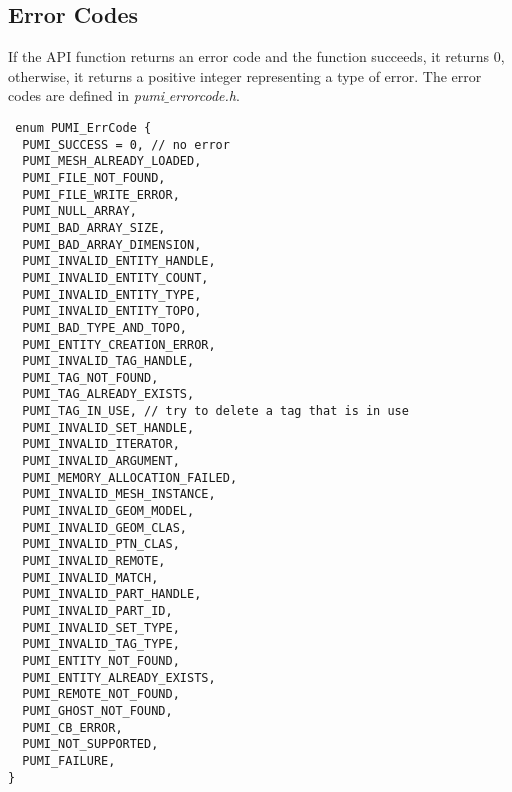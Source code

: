 \subsection{Error Codes}
If the API function returns an error code and the function succeeds, it returns 0,  otherwise, it returns a positive integer representing a type of error. The error codes are defined in \emph{pumi}$\_$\emph{errorcode.h}. 

\begin{verbatim}
 enum PUMI_ErrCode {
  PUMI_SUCCESS = 0, // no error
  PUMI_MESH_ALREADY_LOADED,
  PUMI_FILE_NOT_FOUND,
  PUMI_FILE_WRITE_ERROR,
  PUMI_NULL_ARRAY,
  PUMI_BAD_ARRAY_SIZE,
  PUMI_BAD_ARRAY_DIMENSION,
  PUMI_INVALID_ENTITY_HANDLE,
  PUMI_INVALID_ENTITY_COUNT,
  PUMI_INVALID_ENTITY_TYPE,
  PUMI_INVALID_ENTITY_TOPO,
  PUMI_BAD_TYPE_AND_TOPO,
  PUMI_ENTITY_CREATION_ERROR,
  PUMI_INVALID_TAG_HANDLE,
  PUMI_TAG_NOT_FOUND,
  PUMI_TAG_ALREADY_EXISTS,
  PUMI_TAG_IN_USE, // try to delete a tag that is in use
  PUMI_INVALID_SET_HANDLE,
  PUMI_INVALID_ITERATOR,
  PUMI_INVALID_ARGUMENT,
  PUMI_MEMORY_ALLOCATION_FAILED,
  PUMI_INVALID_MESH_INSTANCE,
  PUMI_INVALID_GEOM_MODEL,
  PUMI_INVALID_GEOM_CLAS,
  PUMI_INVALID_PTN_CLAS,
  PUMI_INVALID_REMOTE,
  PUMI_INVALID_MATCH,
  PUMI_INVALID_PART_HANDLE, 
  PUMI_INVALID_PART_ID,
  PUMI_INVALID_SET_TYPE,
  PUMI_INVALID_TAG_TYPE,
  PUMI_ENTITY_NOT_FOUND,
  PUMI_ENTITY_ALREADY_EXISTS,
  PUMI_REMOTE_NOT_FOUND,
  PUMI_GHOST_NOT_FOUND,
  PUMI_CB_ERROR,
  PUMI_NOT_SUPPORTED,
  PUMI_FAILURE, 
}
\end{verbatim}
